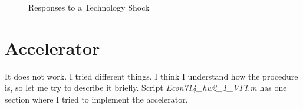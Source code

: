 \documentclass[a4paper,12pt]{article}
\begin{document}
\begin{figure}[!htbp]
        \caption{Responses to a Technology Shock} 
        \label{response_to_tech_shock}
    \end{figure}
    
    
    \medskip
    \medskip
    \section{Accelerator}     
    \medskip
    
    It does not work. I tried different things. I think I understand how the procedure is, so let me try to describe it briefly. Script \textit{Econ714\_hw2\_1\_VFI.m} has one section where I tried to implement the accelerator.  
    
\end{document}

